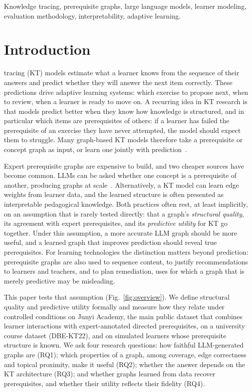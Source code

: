 \documentclass[lettersize,journal]{IEEEtran}
\begin{document}
\begin{IEEEkeywords}
Knowledge tracing, prerequisite graphs, large language models, learner modeling, evaluation methodology, interpretability, adaptive learning.
\end{IEEEkeywords}

\section{Introduction}
 tracing (KT) models estimate what a learner knows from the sequence of their answers and predict whether they will answer the next item correctly. These predictions drive adaptive learning systems: which exercise to propose next, when to review, when a learner is ready to move on. A recurring idea in KT research is that models predict better when they know how knowledge is structured, and in particular which items are prerequisites of others: if a learner has failed the prerequisite of an exercise they have never attempted, the model should expect them to struggle. Many graph-based KT models therefore take a prerequisite or concept graph as input, or learn one jointly with prediction~\cite{chen2018prerequisite,nakagawa2019graph,tong2020structure,zhou2024predictive}.

Expert prerequisite graphs are expensive to build, and two cheaper sources have become common. LLMs can be asked whether one concept is a prerequisite of another, producing graphs at scale~\cite{aytekin2025discovering,le2025llms}. Alternatively, a KT model can learn edge weights from learner data, and the learned structure is often presented as interpretable pedagogical knowledge. Both practices often rest, at least implicitly, on an assumption that is rarely tested directly: that a graph's \emph{structural quality}, its agreement with expert prerequisites, and its \emph{predictive utility} for KT go together. Under this assumption, a more accurate LLM graph should be more useful, and a learned graph that improves prediction should reveal true prerequisites. For learning technologies the distinction matters beyond prediction: prerequisite graphs are also used to sequence content, to justify recommendations to learners and teachers, and to plan remediation, uses for which a graph that is merely predictive may be misleading.

This paper tests that assumption (Fig.~\ref{fig:overview}). We define structural quality and predictive utility formally and measure how they relate under controlled conditions on Junyi Academy, the main public dataset that combines learner interactions with expert-annotated directed prerequisites, on a university course dataset (DBE-KT22), and on simulated learners whose prerequisite structure is known. We ask four research questions: how faithful LLM-generated graphs are (RQ1); which properties of a graph, among coverage, edge correctness and topical proximity, make it useful (RQ2); whether the answer depends on the KT architecture (RQ3); and whether graphs learned from data recover prerequisites, and whether their utility reflects their fidelity (RQ4).
\end{document}
